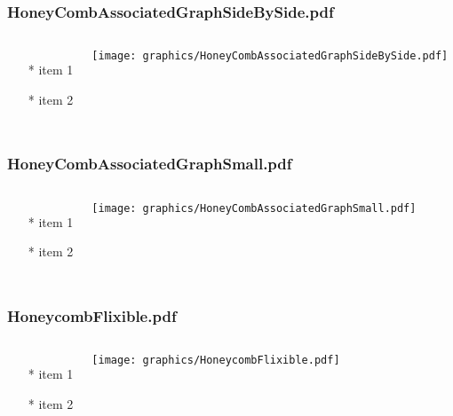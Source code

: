 \documentclass{beamer}
\begin{document}
\begin{frame} \frametitle{HoneyCombAssociatedGraphSideBySide.pdf}
    \begin{columns}[c]
        \begin{itemize}
            \item[*] item 1
            \item[*] item 2
        \end{itemize}
        \begin{minipage}{\linewidth}
            \begin{center}
            \texttt{[image: graphics/HoneyCombAssociatedGraphSideBySide.pdf]}
            \label{gfx:HoneyCombAssociatedGraphSideBySide.pdf}
            \end{center}
        \end{minipage}
    \end{columns}
\end{frame}
\begin{frame} \frametitle{HoneyCombAssociatedGraphSmall.pdf}
    \begin{columns}[c]
        \begin{itemize}
            \item[*] item 1
            \item[*] item 2
        \end{itemize}
        \begin{minipage}{\linewidth}
            \begin{center}
            \texttt{[image: graphics/HoneyCombAssociatedGraphSmall.pdf]}
            \label{gfx:HoneyCombAssociatedGraphSmall.pdf}
            \end{center}
        \end{minipage}
    \end{columns}
\end{frame}
\begin{frame} \frametitle{HoneycombFlixible.pdf}
    \begin{columns}[c]
        \begin{itemize}
            \item[*] item 1
            \item[*] item 2
        \end{itemize}
        \begin{minipage}{\linewidth}
            \begin{center}
            \texttt{[image: graphics/HoneycombFlixible.pdf]}
            \label{gfx:HoneycombFlixible.pdf}
            \end{center}
        \end{minipage}
    \end{columns}
\end{frame}
\end{document}
